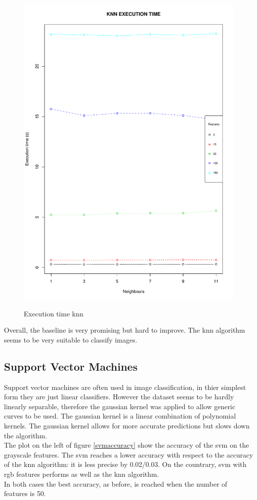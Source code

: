 \documentclass{article}
\begin{document}
\begin{figure}[H]
\begin{adjustwidth}{-4cm}{-4cm}
{    \includegraphics[scale=0.3]{../knn_time_rgb.pdf}  
     }
     \centering
     \caption{Execution time knn}
      \end{adjustwidth}
   \end{figure}
   
\noindent Overall, the baseline is very promising but hard to improve. The knn algorithm seems to be very suitable to classify images.

\subsection{Support Vector Machines}
Support vector machines are often used in image classification, in thier simplest form they are just linear classifiers. However the dataset seems to be hardly linearly separable, therefore the gaussian kernel was applied to allow generic curves to be used. The gaussian kernel is a linear combination of polynomial kernels. The gaussian kernel allows for more accurate predictions but slows down the algorithm.\\
The plot on the left of figure \ref{svmaccuracy} show the accuracy of the svm on the grayscale features. The svm reaches a lower accuracy with respect to the accuracy of the knn algorithm: it is less precise by 0.02/0.03. On the countrary, svm with rgb features performs as well as the knn algorithm.\\
In both cases the best accuracy, as before, is reached when the number of features is 50.
\end{document}
